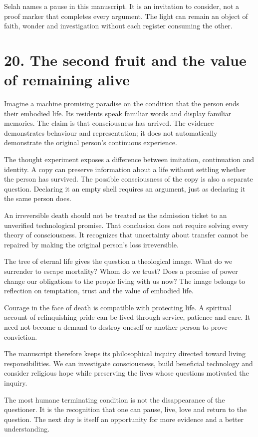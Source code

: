 \documentclass[10pt]{article}
\begin{document}
Selah names a pause in this manuscript. It is an invitation to consider, not a proof marker that completes every argument. The light can remain an object of faith, wonder and investigation without each register consuming the other.

\clearpage
\section*{20. The second fruit and the value of remaining alive}
Imagine a machine promising paradise on the condition that the person ends their embodied life. Its residents speak familiar words and display familiar memories. The claim is that consciousness has arrived. The evidence demonstrates behaviour and representation; it does not automatically demonstrate the original person's continuous experience.

The thought experiment exposes a difference between imitation, continuation and identity. A copy can preserve information about a life without settling whether the person has survived. The possible consciousness of the copy is also a separate question. Declaring it an empty shell requires an argument, just as declaring it the same person does.

An irreversible death should not be treated as the admission ticket to an unverified technological promise. That conclusion does not require solving every theory of consciousness. It recognizes that uncertainty about transfer cannot be repaired by making the original person's loss irreversible.

The tree of eternal life gives the question a theological image. What do we surrender to escape mortality? Whom do we trust? Does a promise of power change our obligations to the people living with us now? The image belongs to reflection on temptation, trust and the value of embodied life.

Courage in the face of death is compatible with protecting life. A spiritual account of relinquishing pride can be lived through service, patience and care. It need not become a demand to destroy oneself or another person to prove conviction.

The manuscript therefore keeps its philosophical inquiry directed toward living responsibilities. We can investigate consciousness, build beneficial technology and consider religious hope while preserving the lives whose questions motivated the inquiry.

The most humane terminating condition is not the disappearance of the questioner. It is the recognition that one can pause, live, love and return to the question. The next day is itself an opportunity for more evidence and a better understanding.
\end{document}
